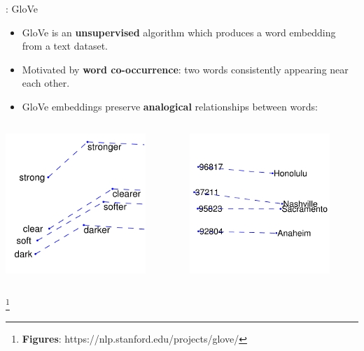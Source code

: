 \documentclass{beamer}
\newcommand\blfootnote[1]{%
  \begingroup
  \renewcommand\thefootnote{}\footnote{#1}%
  \addtocounter{footnote}{-1}%
  \endgroup
}
\begin{document}
\begin{frame}{\secname: GloVe}
\begin{itemize}
    \item GloVe is an \textbf{unsupervised} algorithm which produces a word embedding from a text dataset.
    
    \item Motivated by \textbf{word co-occurrence}: two words consistently appearing near each other.
    
    \item GloVe embeddings preserve \textbf{analogical} relationships between words:
\end{itemize}

\begin{columns}
\begin{column}{0.5\textwidth}
\centering
\includegraphics[scale=7]{images/glove-1.jpg}
\end{column}
\begin{column}{0.5\textwidth}
\centering
\includegraphics[scale=8]{images/glove-2.jpg}
\end{column}
\end{columns}
\blfootnote{\textbf{Figures}: https://nlp.stanford.edu/projects/glove/}
\end{frame}
\end{document}
